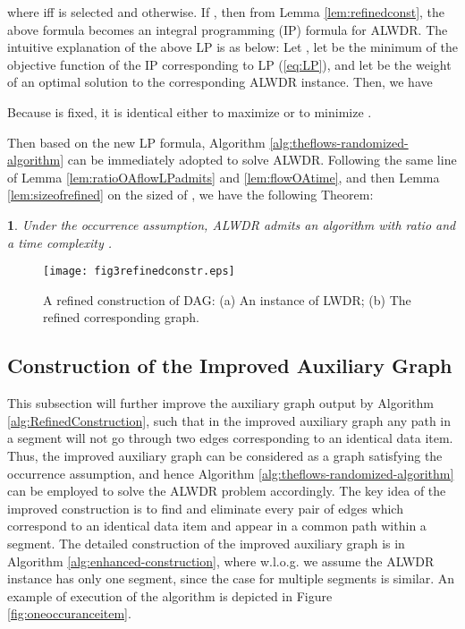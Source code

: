 \documentclass[11pt,english,onecolumn,draftcls]{IEEEtran}
\theoremstyle{plain}
\newtheorem{thm}{\protect\theoremname}
\theoremstyle{plain}
\theoremstyle{plain}
\theoremstyle{plain}
\providecommand{\theoremname}{Theorem}
\begin{document}
where  iff  is selected and  otherwise. If
, then from Lemma \ref{lem:refinedconst}, the
above formula becomes an integral programming (IP) formula for ALWDR.
The intuitive explanation of the above LP is as below: Let ,
let  be the minimum of the objective function of the IP corresponding
to LP (\ref{eq:LP}), and let  be the weight of an optimal
solution to the corresponding ALWDR instance. Then,
we have

Because  is fixed, it is identical either to maximize 
or to minimize .

Then based on the new LP formula, Algorithm \ref{alg:theflows-randomized-algorithm}
can be immediately adopted to solve ALWDR. Following
the same line of Lemma \ref{lem:ratioOAflowLPadmits} and \ref{lem:flowOAtime},
and then Lemma \ref{lem:sizeofrefined} on the sized of , we have
the following Theorem:
\begin{thm}
Under the occurrence assumption, ALWDR admits an
algorithm with ratio  and a time complexity .
\end{thm}
\begin{figure}
\texttt{[image: fig3refinedconstr.eps]}

\protect\caption{\label{fig:A-Refined-Construction}A refined construction of DAG:
(a) An instance of LWDR; (b) The refined corresponding graph. }
\end{figure}



\subsection{Construction of the Improved Auxiliary Graph}

This subsection will further improve the auxiliary graph output by
Algorithm \ref{alg:RefinedConstruction}, such that in the improved
auxiliary graph any path in a segment will not go through two edges
corresponding to an identical data item. Thus, the improved auxiliary
graph can be considered as a graph satisfying the occurrence assumption,
and hence Algorithm \ref{alg:theflows-randomized-algorithm} can be
employed to solve the ALWDR problem accordingly.
The key idea of the improved construction is to find and eliminate
every pair of edges which correspond to an identical data item and
appear in a common path within a segment. The detailed construction
of the improved auxiliary graph is in Algorithm \ref{alg:enhanced-construction},
where w.l.o.g. we assume the ALWDR instance has
only one segment, since the case for multiple segments is similar.
An example of execution of the algorithm is depicted in Figure \ref{fig:oneoccuranceitem}.
\end{document}
